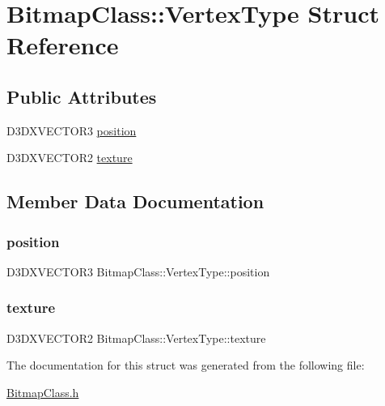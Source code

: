 \hypertarget{struct_bitmap_class_1_1_vertex_type}{}\section{Bitmap\+Class\+:\+:Vertex\+Type Struct Reference}
\label{struct_bitmap_class_1_1_vertex_type}
\subsection*{Public Attributes}
\begin{DoxyCompactItemize}
\item 
D3\+D\+X\+V\+E\+C\+T\+O\+R3 \hyperlink{struct_bitmap_class_1_1_vertex_type_a631c8f3f1c00a4465a7b3bc316c10f76}{position}
\item 
D3\+D\+X\+V\+E\+C\+T\+O\+R2 \hyperlink{struct_bitmap_class_1_1_vertex_type_a2fee35a5b55e06857c03541f84c17bd1}{texture}
\end{DoxyCompactItemize}


\subsection{Member Data Documentation}
\mbox{\label{struct_bitmap_class_1_1_vertex_type_a631c8f3f1c00a4465a7b3bc316c10f76}} 
\subsubsection{\texorpdfstring{position}{position}}
{\footnotesize\ttfamily D3\+D\+X\+V\+E\+C\+T\+O\+R3 Bitmap\+Class\+::\+Vertex\+Type\+::position}

\mbox{\label{struct_bitmap_class_1_1_vertex_type_a2fee35a5b55e06857c03541f84c17bd1}} 
\subsubsection{\texorpdfstring{texture}{texture}}
{\footnotesize\ttfamily D3\+D\+X\+V\+E\+C\+T\+O\+R2 Bitmap\+Class\+::\+Vertex\+Type\+::texture}



The documentation for this struct was generated from the following file\+:\begin{DoxyCompactItemize}
\item 
\hyperlink{_bitmap_class_8h}{Bitmap\+Class.\+h}\end{DoxyCompactItemize}

